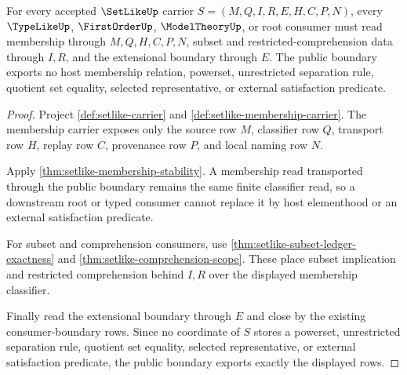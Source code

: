 \begin{theorem}
\label{thm:setlike-membership-classifier-public-boundary}
For every accepted $\SetLikeUp$ carrier $S=(M,Q,I,R,E,H,C,P,N)$, every $\TypeLikeUp$, $\FirstOrderUp$, $\ModelTheoryUp$, or root consumer must read membership through $M,Q,H,C,P,N$, subset and restricted-comprehension data through $I,R$, and the extensional boundary through $E$. The public boundary exports no host membership relation, powerset, unrestricted separation rule, quotient set equality, selected representative, or external satisfaction predicate.
\end{theorem}
\begin{proof}
Project \autoref{def:setlike-carrier} and \autoref{def:setlike-membership-carrier}. The membership carrier exposes only the source row $M$, classifier row $Q$, transport row $H$, replay row $C$, provenance row $P$, and local naming row $N$.

Apply \autoref{thm:setlike-membership-stability}. A membership read transported through the public boundary remains the same finite classifier read, so a downstream root or typed consumer cannot replace it by host elementhood or an external satisfaction predicate.

For subset and comprehension consumers, use \autoref{thm:setlike-subset-ledger-exactness} and \autoref{thm:setlike-comprehension-scope}. These place subset implication and restricted comprehension behind $I,R$ over the displayed membership classifier.

Finally read the extensional boundary through $E$ and close by the existing consumer-boundary rows. Since no coordinate of $S$ stores a powerset, unrestricted separation rule, quotient set equality, selected representative, or external satisfaction predicate, the public boundary exports exactly the displayed rows.
\end{proof}

